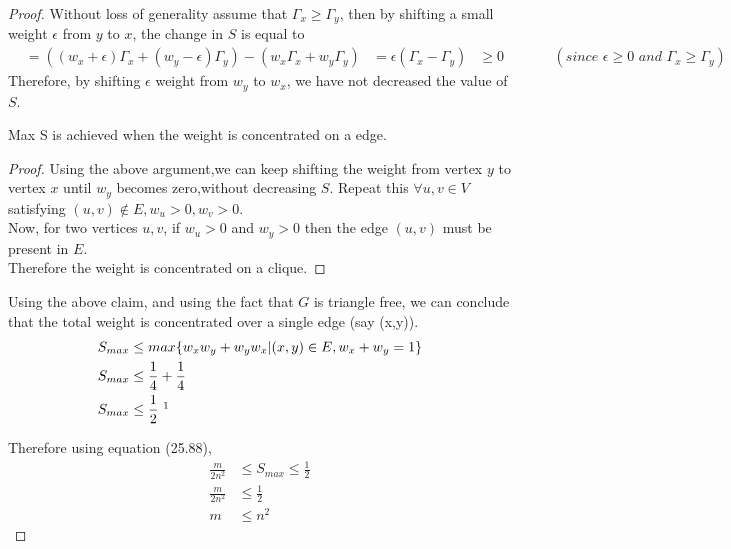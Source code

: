 \begin{proof}
Without loss of generality assume that $\Gamma_x \ge \Gamma_y$, then by shifting a small weight $\epsilon$ from $y$ to $x$, the change in $S$ is equal to 
\begin{align*}
    &=( (w_x+\epsilon)\Gamma_x + (w_y-\epsilon)\Gamma_y ) - ( w_x\Gamma_x + w_y\Gamma_y )
    &= \epsilon(\Gamma_x-\Gamma_y)
    &\ge 0~~~~~~~~~~~~~~~~(\textit{since $\epsilon \ge 0$ and $\Gamma_x\ge \Gamma_y$})
\end{align*}
Therefore, by shifting $\epsilon$ weight from $w_y$ to $w_x$, we have not decreased the value of $S$.

\begin{claim}
Max S is achieved when the weight is concentrated on a edge.
\end{claim}
\begin{proof}
Using the above argument,we can keep shifting the weight from vertex $y$ to vertex $x$ until $w_y$ becomes zero,without decreasing $S$.
Repeat this $\forall u,v \in V$ satisfying $(u,v)\notin E, w_u>0, w_v>0$.\\
Now, for two vertices $u,v$, if $w_u>0$ and $w_y>0$ then the edge $(u,v)$ must be present in $E$.\\
Therefore the weight is concentrated on a clique.
\end{proof}

Using the above claim, and using the fact that $G$ is triangle free, we can conclude that the total weight is
concentrated over a single edge (say (x,y)).
\begin{align*}
    S_{max} &\le max\{w_xw_y+w_yw_x|(x,y)\in E, w_x+w_y=1 \}\\
    S_{max} &\le \frac{1}{4}+\frac{1}{4}\\
    S_{max} &\le \frac{1}{2} ~\footnotemark\\
\end{align*}
 
Therefore using equation (25.88),
\begin{align*}
    \frac{m}{2n^2} &\le S_{max} \le \frac{1}{2} \\
    \frac{m}{2n^2} &\le \frac{1}{2}\\
    m &\le n^2
\end{align*}

\end{proof}
